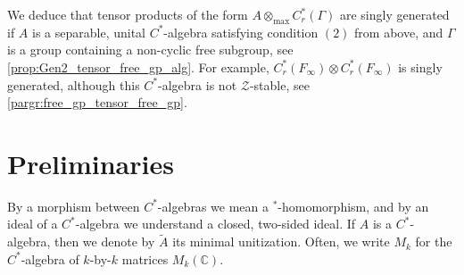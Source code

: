 \documentclass{amsart}
\theoremstyle{definition}
\begin{document}
    We deduce that tensor products of the form $A\otimes_{\text{max}} C^*_r(\Gamma)$ are singly generated if $A$ is a separable, unital {{$C^*$-al\-ge\-bra}}{} satisfying condition $(2)$ from above, and $\Gamma$ is a group containing a non-cyclic free subgroup, see \autoref{prop:Gen2_tensor_free_gp_alg}.
    For example, $C^*_r(F_\infty)\otimes C^*_r(F_\infty)$ is singly generated, although this {{$C^*$-al\-ge\-bra}}{} is not $\mathcal{Z}$-stable, see \autoref{pargr:free_gp_tensor_free_gp}.

\section{Preliminaries}
\label{sect:prelim}

\noindent
    By a morphism between {{$C^*$-al\-ge\-bra}}{s} we mean a $^{*}$-homomorphism, and by an ideal of a {{$C^*$-al\-ge\-bra}}{} we understand a closed, two-sided ideal.
    If $A$ is a {{$C^*$-al\-ge\-bra}}{}, then we denote by $\widetilde{A}$ its minimal unitization.
    Often, we write $M_k$ for the {{$C^*$-al\-ge\-bra}}{} of $k$-by-$k$ matrices $M_k({{\mathbb{C}}})$.
\end{document}
